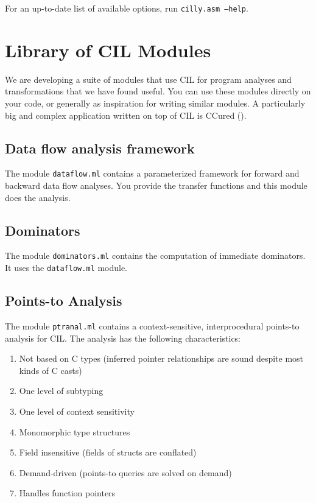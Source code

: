 \documentclass{article}
\def\t#1{{\tt #1}}
\begin{document}
\begin{itemize}
For an up-to-date list of available options, run \t{cilly.asm --help}. 

\end{itemize}

\section{Library of CIL Modules} \label{sec-Extension}

 We are developing a suite of modules that use CIL for program analyses and
transformations that we have found useful. You can use these modules directly
on your code, or generally as inspiration for writing similar modules. A
particularly big and complex application written on top of CIL is CCured
().

\subsection{Data flow analysis framework}

 The module \t{dataflow.ml} contains a parameterized framework for forward and
backward data flow analyses. You provide the transfer functions and this
module does the analysis. 

\subsection{Dominators} 
 
 The module \t{dominators.ml} contains the computation of immediate
 dominators. It uses the \t{dataflow.ml} module. 

\subsection{Points-to Analysis}

The module \t{ptranal.ml} contains a context-sensitive, interprocedural
points-to analysis for CIL. The analysis has the following
characteristics:

\begin{enumerate}
\item Not based on C types (inferred pointer relationships are sound
despite most kinds of C casts)
\item One level of subtyping 
\item One level of context sensitivity
\item Monomorphic type structures
\item Field insensitive (fields of structs are conflated)
\item Demand-driven (points-to queries are solved on demand)
\item Handles function pointers 
\end{enumerate}
\end{document}
